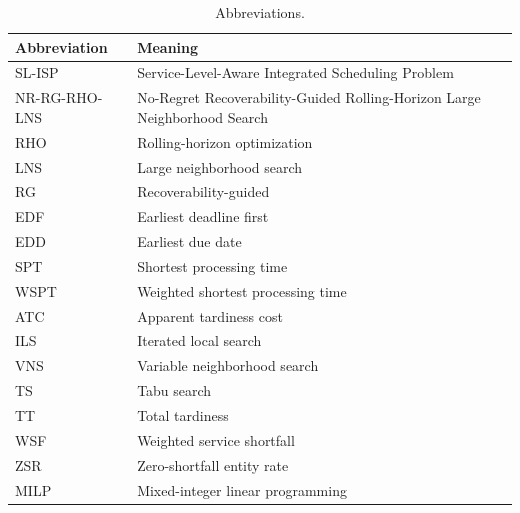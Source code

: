 \documentclass[a4paper,fleqn]{cas-sc}
\begin{document}
\begin{table}[!t]
\centering
\caption{Abbreviations.}
\label{tab:abbreviations}
\small
\begin{tabularx}{\textwidth}{lY}
\toprule
\textbf{Abbreviation} & \textbf{Meaning} \\
\midrule
SL-ISP & Service-Level-Aware Integrated Scheduling Problem \\
NR-RG-RHO-LNS & No-Regret Recoverability-Guided Rolling-Horizon Large Neighborhood Search \\
RHO & Rolling-horizon optimization \\
LNS & Large neighborhood search \\
RG & Recoverability-guided \\
EDF & Earliest deadline first \\
EDD & Earliest due date \\
SPT & Shortest processing time \\
WSPT & Weighted shortest processing time \\
ATC & Apparent tardiness cost \\
ILS & Iterated local search \\
VNS & Variable neighborhood search \\
TS & Tabu search \\
TT & Total tardiness \\
WSF & Weighted service shortfall \\
ZSR & Zero-shortfall entity rate \\
MILP & Mixed-integer linear programming \\
\bottomrule
\end{tabularx}
\end{table}
\end{document}

